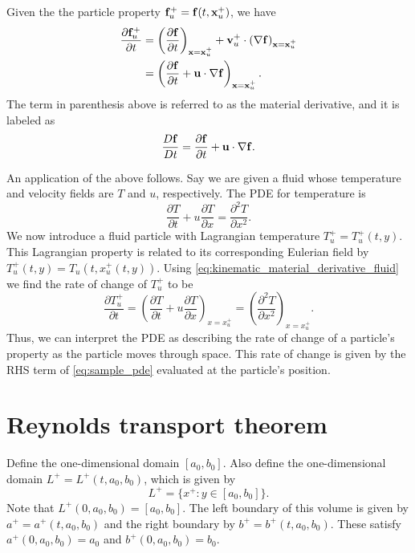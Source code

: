 \documentclass[oneside,a4paper,11pt]{report}
\begin{document}
Given the the particle property $\mathbf{f}^+_u = \mathbf{f}(t,\mathbf{x}^+_u)$, we have
\begin{align}
\label{eq:kinematic_material_derivative_fluid}
\frac{\partial \mathbf{f}^+_u}{\partial t} &=\left(\frac{\partial \mathbf{f}}{\partial t}\right)_{\mathbf{x}=\mathbf{x}^+_u} + \mathbf{v}^+_u \cdot \left(\nabla \mathbf{f}\right)_{\mathbf{x}=\mathbf{x}^+_u} \nonumber \\
&=\left(\frac{\partial \mathbf{f}}{\partial t} + \mathbf{u} \cdot \nabla \mathbf{f}\right)_{\mathbf{x}=\mathbf{x}^+_u}.
\end{align}
The term in parenthesis above is referred to as the material derivative, and it is labeled as
\begin{equation}
\label{eq:material_derivative_definition}
    \frac{D\mathbf{f}}{Dt} = \frac{\partial \mathbf{f}}{\partial t} + \mathbf{u} \cdot \nabla \mathbf{f}.
\end{equation}

An application of the above follows. Say we are given a fluid whose temperature and velocity fields are $T$ and $u$, respectively. The PDE for temperature is
\begin{equation}
\label{eq:sample_pde}
\frac{\partial T}{\partial t} + u\frac{\partial T}{\partial x} = \frac{\partial^2 T}{\partial x^2}.
\end{equation}
We now introduce a fluid particle with Lagrangian temperature $T^+_u = T^+_u(t,y)$. This Lagrangian property is related to its corresponding Eulerian field by $T^+_u(t,y) = T_u(t,x^+_u(t,y))$. Using \cref{eq:kinematic_material_derivative_fluid} we find the rate of change of $T^+_u$ to be
\begin{equation}
\frac{\partial T^+_u}{\partial t} = \left( \frac{\partial T}{\partial t} +  u\frac{\partial T}{\partial x} \right)_{x = x^+_u} = \left ( \frac{\partial^2 T}{\partial x^2} \right)_{x = x^+_u}. 
\end{equation}
Thus, we can interpret the PDE as describing the rate of change of a particle's property as the particle moves through space. This rate of change is given by the RHS term of \cref{eq:sample_pde} evaluated at the particle's position. 

\section{Reynolds transport theorem}
Define the one-dimensional domain $[a_0,b_0]$. Also define the one-dimensional domain $L^+ = L^+(t,a_0,b_0)$, which is given by 
\begin{equation}
    L^+ = \{ x^+ : y \in [a_0,b_0] \}.
\end{equation}
Note that $L^+(0,a_0,b_0) = [a_0,b_0]$. The left boundary of this volume is given by $a^+ = a^+(t,a_0,b_0)$ and the right boundary by $b^+=b^+(t,a_0,b_0)$. These satisfy $a^+(0,a_0,b_0) = a_0$ and $b^+(0,a_0,b_0) = b_0$. 
\end{document}
